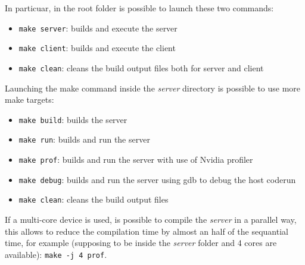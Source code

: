 \documentclass[paper=a4, fontsize=10pt]{scrartcl}	%
\begin{document}
	In particuar, in the root folder is possible to launch these two commands:

	\begin{itemize}
		\itemsep 0sp
		\item \texttt{make server}: builds and execute the server
		\item \texttt{make client}: builds and execute the client
		\item \texttt{make clean}: cleans the build output files both for server and client
	\end{itemize}

	Launching the make command inside the \textit{server} directory is possible to use more make targets:

	\begin{itemize}
		\itemsep 0sp
		\item \texttt{make build}: builds the server
		\item \texttt{make run}: builds and run the server
		\item \texttt{make prof}: builds and run the server with use of Nvidia profiler
		\item \texttt{make debug}: builds and run the server using gdb to debug the host coderun
		\item \texttt{make clean}: cleans the build output files
	\end{itemize}

	If a multi-core device is used, is possible to compile the \textit{server} in a parallel way, this allows to reduce the compilation time by almost an half of the sequantial time, for example (supposing to be inside the \textit{server} folder and 4 cores are available): \texttt{make -j 4 prof}.\\
\end{document}
